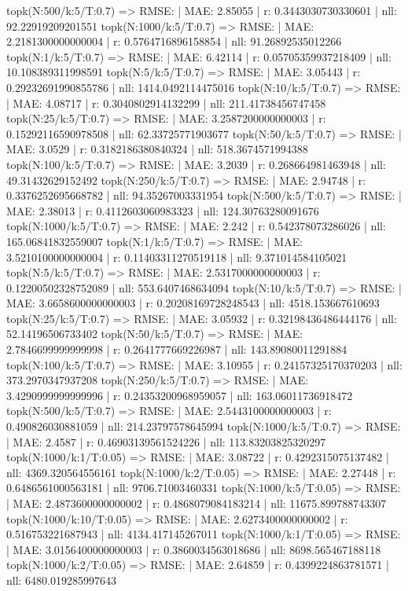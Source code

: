 topk(N:500/k:5/T:0.7) => RMSE: | MAE: 2.85055 | r: 0.3443030730330601 | nll: 92.22919209201551
topk(N:1000/k:5/T:0.7) => RMSE: | MAE: 2.2181300000000004 | r: 0.5764716896158854 | nll: 91.26892535012266
topk(N:1/k:5/T:0.7) => RMSE: | MAE: 6.42114 | r: 0.05705359937218409 | nll: 10.108389311998591
topk(N:5/k:5/T:0.7) => RMSE: | MAE: 3.05443 | r: 0.29232691990855786 | nll: 1414.0492114475016
topk(N:10/k:5/T:0.7) => RMSE: | MAE: 4.08717 | r: 0.3040802914132299 | nll: 211.41738456747458
topk(N:25/k:5/T:0.7) => RMSE: | MAE: 3.2587200000000003 | r: 0.15292116590978508 | nll: 62.33725771903677
topk(N:50/k:5/T:0.7) => RMSE: | MAE: 3.0529 | r: 0.3182186380840324 | nll: 518.3674571994388
topk(N:100/k:5/T:0.7) => RMSE: | MAE: 3.2039 | r: 0.268664981463948 | nll: 49.31432629152492
topk(N:250/k:5/T:0.7) => RMSE: | MAE: 2.94748 | r: 0.3376252695668782 | nll: 94.35267003331954
topk(N:500/k:5/T:0.7) => RMSE: | MAE: 2.38013 | r: 0.4112603060983323 | nll: 124.30763280091676
topk(N:1000/k:5/T:0.7) => RMSE: | MAE: 2.242 | r: 0.542378073286026 | nll: 165.06841832559007
topk(N:1/k:5/T:0.7) => RMSE: | MAE: 3.5210100000000004 | r: 0.11403311270519118 | nll: 9.371014584105021
topk(N:5/k:5/T:0.7) => RMSE: | MAE: 2.5317000000000003 | r: 0.12200502328752089 | nll: 553.6407468634094
topk(N:10/k:5/T:0.7) => RMSE: | MAE: 3.6658600000000003 | r: 0.20208169728248543 | nll: 4518.153667610693
topk(N:25/k:5/T:0.7) => RMSE: | MAE: 3.05932 | r: 0.32198436486444176 | nll: 52.14196506733402
topk(N:50/k:5/T:0.7) => RMSE: | MAE: 2.7846699999999998 | r: 0.2641777669226987 | nll: 143.89080011291884
topk(N:100/k:5/T:0.7) => RMSE: | MAE: 3.10955 | r: 0.24157325170370203 | nll: 373.2970347937208
topk(N:250/k:5/T:0.7) => RMSE: | MAE: 3.4290999999999996 | r: 0.24353200968959057 | nll: 163.06011736918472
topk(N:500/k:5/T:0.7) => RMSE: | MAE: 2.5443100000000003 | r: 0.490826030881059 | nll: 214.23797578645994
topk(N:1000/k:5/T:0.7) => RMSE: | MAE: 2.4587 | r: 0.46903139561524226 | nll: 113.83203825320297
topk(N:1000/k:1/T:0.05) => RMSE: | MAE: 3.08722 | r: 0.4292315075137482 | nll: 4369.320564556161
topk(N:1000/k:2/T:0.05) => RMSE: | MAE: 2.27448 | r: 0.6486561000563181 | nll: 9706.71003460331
topk(N:1000/k:5/T:0.05) => RMSE: | MAE: 2.4873600000000002 | r: 0.4868079084183214 | nll: 11675.899788743307
topk(N:1000/k:10/T:0.05) => RMSE: | MAE: 2.6273400000000002 | r: 0.516753221687943 | nll: 4134.417145267011
topk(N:1000/k:1/T:0.05) => RMSE: | MAE: 3.0156400000000003 | r: 0.3860034563018686 | nll: 8698.565467188118
topk(N:1000/k:2/T:0.05) => RMSE: | MAE: 2.64859 | r: 0.4399224863781571 | nll: 6480.019285997643
